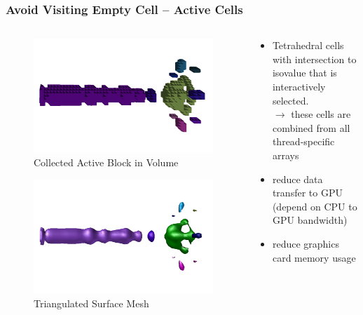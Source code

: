\documentclass[8pt]{beamer}
\begin{document}
\begin{frame}
  \frametitle{Avoid Visiting Empty Cell -- Active Cells}
   \begin{columns}
    \begin{column}{0.5\textwidth}
      \begin{figure}[H]
        \centering
        \includegraphics[width=.7\textwidth]{images/activecell-activeblock.png}\\
        \caption{Collected Active Block in Volume}
        \includegraphics[width=.7\textwidth]{images/activecell-surface-fuel.png}
        \caption{Triangulated Surface Mesh}
        \label{fig:act_cell_tri}
      \end{figure}
    \end{column}
    \vline{}
    \begin{column}{0.5\textwidth}
      \begin{itemize}
      \item {} Tetrahedral cells with intersection to isovalue 
        that is interactively selected.\\
        $\rightarrow$ these cells are combined from all thread-specific arrays
      \end{itemize}
      \begin{itemize}
      \item reduce data transfer to GPU\\ (depend on CPU to GPU bandwidth)
      \item reduce graphics card memory usage
      \end{itemize}
    \end{column}
  \end{columns}
  
\end{frame}
\note{}
\end{document}
